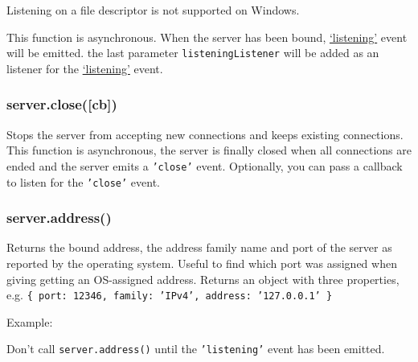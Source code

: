 Listening on a file descriptor is not supported on Windows.

This function is asynchronous. When the server has been bound,
\hyperref[event_listening_]{`listening'} event will be emitted. the
last parameter \texttt{listeningListener} will be added as an listener
for the \hyperref[event_listening_]{`listening'} event.

\subsubsection{server.close({[}cb{]})}

Stops the server from accepting new connections and keeps existing
connections. This function is asynchronous, the server is finally closed
when all connections are ended and the server emits a \texttt{'close'}
event. Optionally, you can pass a callback to listen for the
\texttt{'close'} event.

\subsubsection{server.address()}

Returns the bound address, the address family name and port of the
server as reported by the operating system. Useful to find which port
was assigned when giving getting an OS-assigned address. Returns an
object with three properties, e.g.
\texttt{\{ port: 12346, family: 'IPv4', address: '127.0.0.1' \}}

Example:

\begin{Shaded}
\end{Shaded}

Don't call \texttt{server.address()} until the \texttt{'listening'}
event has been emitted.

